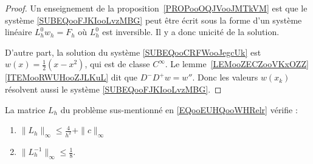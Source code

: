 \begin{proof}
	Un enseignement de la proposition~\ref{PROPooOQJVooJMTkVM} est que le système \eqref{SUBEQooFJKIooLvzMBG} peut être écrit sous la forme d'un système linéaire \( L^0_hw_h=F_h\) où \( L_h^0\) est inversible. Il y a donc unicité de la solution.

	D'autre part, la solution du système \eqref{SUBEQooCRFWooJegcUk} est \( w(x)=\frac{ 1 }{2}(x-x^2)\), qui est de classe \(  C^{\infty}\). Le lemme~\ref{LEMooZECZooVKxOZZ}\ref{ITEMooRWUHooZJLKuL} dit que \( D^-D^+w=w''\). Donc les valeurs \( w(x_k)\) résolvent aussi le système \eqref{SUBEQooFJKIooLvzMBG}.
\end{proof}

\begin{lemma}
	La matrice \( L_h\) du problème sus-mentionné en \eqref{EQooEUHQooWHRelr} vérifie :
	\begin{enumerate}
		\item
		      \( \| L_h \|_{\infty}\leq \frac{4 }{ h^2 }+\| c \|_{\infty}\)
		\item
		      \( \| L_h^{-1} \|_{\infty}\leq \frac{1}{ 8 }\).
	\end{enumerate}
\end{lemma}

